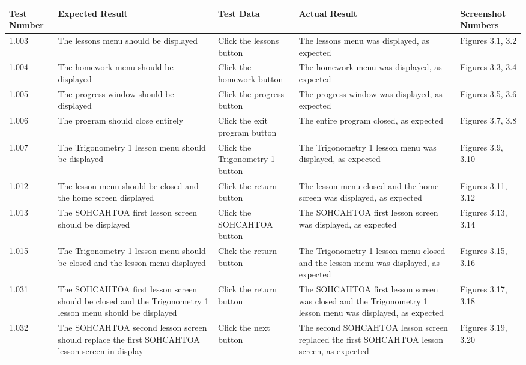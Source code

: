 \begin{landscape}

\begin{center}
\begin{longtable}{|p{2.5cm}|p{4cm}|p{4cm}|p{4.5cm}|p{3cm}|} \hline
\textbf{Test Number} & \textbf{Expected Result} & \textbf{Test Data} & \textbf{Actual Result} & \textbf{Screenshot Numbers} \\ \hline
1.003 & The lessons menu should be displayed & Click the lessons button & The lessons menu was displayed, as expected & Figures 3.1, 3.2 \\ \hline
1.004 & The homework menu should be displayed & Click the homework button & The homework menu was displayed, as expected & Figures 3.3, 3.4 \\ \hline
1.005 & The progress window should be displayed & Click the progress button & The progress window was displayed, as expected & Figures 3.5, 3.6 \\ \hline
1.006 & The program should close entirely & Click the exit program button & The entire program closed, as expected & Figures 3.7, 3.8 \\ \hline
1.007 & The Trigonometry 1 lesson menu should be displayed & Click the Trigonometry 1 button & The Trigonometry 1 lesson menu was displayed, as expected & Figures 3.9, 3.10 \\ \hline
1.012 & The lesson menu should be closed and the home screen displayed & Click the return button & The lesson menu closed and the home screen was displayed, as expected & Figures 3.11, 3.12 \\ \hline
1.013 & The SOHCAHTOA first lesson screen should be displayed & Click the SOHCAHTOA button & The SOHCAHTOA first lesson screen was displayed, as expected & Figures 3.13, 3.14 \\ \hline
1.015 & The Trigonometry 1 lesson menu should be closed and the lesson menu displayed & Click the return button & The Trigonometry 1 lesson menu closed and the lesson menu was displayed, as expected & Figures 3.15, 3.16 \\ \hline
1.031 & The SOHCAHTOA first lesson screen should be closed and the Trigonometry 1 lesson menu should be displayed & Click the return button & The SOHCAHTOA first lesson screen was closed and the Trigonometry 1 lesson menu was displayed, as expected & Figures 3.17, 3.18 \\ \hline
1.032 & The SOHCAHTOA second lesson screen should replace the first SOHCAHTOA lesson screen in display & Click the next button & The second SOHCAHTOA lesson screen replaced the first SOHCAHTOA lesson screen, as expected & Figures 3.19, 3.20 \\ \hline

\end{longtable}
\end{center}
\end{landscape}

